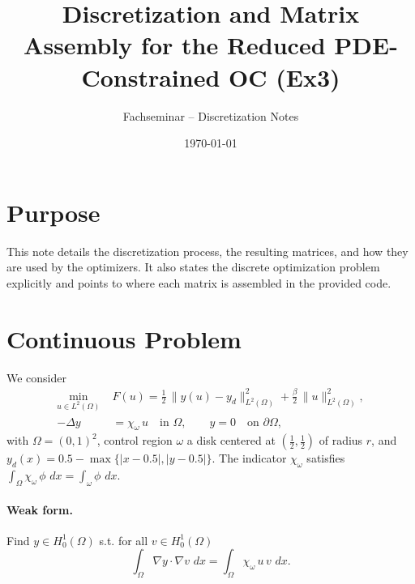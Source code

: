\documentclass[11pt,a4paper]{article}
\title{Discretization and Matrix Assembly for the Reduced PDE-Constrained OC (Ex3)}
\author{Fachseminar – Discretization Notes}
\date{\today}
\newcommand{\dx}{\,dx}
\begin{document}
\maketitle

\section*{Purpose}
This note details the discretization process, the resulting matrices, and how they are used by the optimizers. It also states the discrete optimization problem explicitly and points to where each matrix is assembled in the provided code.

\section{Continuous Problem}
We consider
\begin{align}
  \min_{u\in L^2(\Omega)}\; &F(u) = \tfrac{1}{2}\,\|y(u)-y_d\|_{L^2(\Omega)}^2 + \tfrac{\beta}{2}\,\|u\|_{L^2(\Omega)}^2,\\
  -\Delta y &= \chi_{\omega}\,u \quad \text{in } \Omega, \qquad y=0 \quad \text{on } \partial\Omega,
\end{align}
with $\Omega=(0,1)^2$, control region $\omega$ a disk centered at $(\tfrac12,\tfrac12)$ of radius $r$, and
$y_d(x)=0.5-\max\{\lvert x-0.5\rvert,\lvert y-0.5\rvert\}$. The indicator $\chi_{\omega}$ satisfies
$\int_{\Omega} \chi_{\omega}\,\phi\,\dx=\int_{\omega}\!\phi\,\dx$.

\paragraph{Weak form.} Find $y\in H_0^1(\Omega)$ s.t. for all $v\in H_0^1(\Omega)$
\begin{equation}
  \int_{\Omega} \nabla y\!\cdot\!\nabla v\,\dx = \int_{\Omega} \chi_{\omega}\,u\,v\,\dx.
\end{equation}
\end{document}
